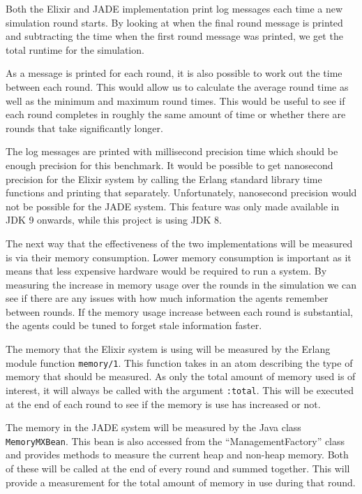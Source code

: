Both the Elixir and JADE implementation print log messages each time a new simulation round starts.
By looking at when the final round message is printed and subtracting the time when the first round message was printed, we get the total runtime for the simulation.

As a message is printed for each round, it is also possible to work out the time between each round.
This would allow us to calculate the average round time as well as the minimum and maximum round times.
This would be useful to see if each round completes in roughly the same amount of time or whether there are rounds that take significantly longer.

The log messages are printed with millisecond precision time which should be enough precision for this benchmark.
It would be possible to get nanosecond precision for the Elixir system by calling the Erlang standard library time functions and printing that separately.
Unfortunately, nanosecond precision would not be possible for the JADE system.
This feature was only made available in JDK 9 onwards, while this project is using JDK 8.

The next way that the effectiveness of the two implementations will be measured is via their memory consumption.
Lower memory consumption is important as it means that less expensive hardware would be required to run a system.
By measuring the increase in memory usage over the rounds in the simulation we can see if there are any issues with how much information the agents remember between rounds.
If the memory usage increase between each round is substantial, the agents could be tuned to forget stale information faster.

The memory that the Elixir system is using will be measured by the Erlang module function \verb|memory/1|.
This function takes in an atom describing the type of memory that should be measured.
As only the total amount of memory used is of interest, it will always be called with the argument \verb|:total|.
This will be executed at the end of each round to see if the memory is use has increased or not.

The memory in the JADE system will be measured by the Java class \\ \verb|MemoryMXBean|.
This bean is also accessed from the ``ManagementFactory'' class and provides methods to measure the current heap and non-heap memory.
Both of these will be called at the end of every round and summed together.
This will provide a measurement for the total amount of memory in use during that round.

